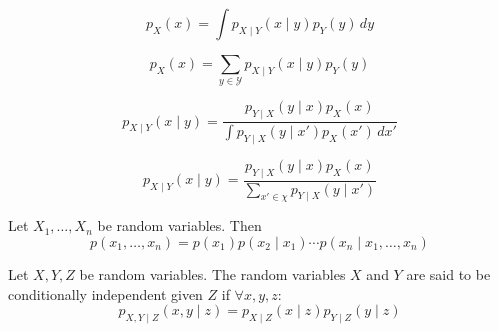 \begin{ctheorem*}
  \[p_X(x) = \int p_{X \mid Y}(x \mid y) p_Y(y) \, dy\]
\end{ctheorem*}

\begin{dtheorem*}
  \[p_X(x) = \sum_{y \in \mathcal{Y}} p_{X \mid Y}(x \mid y)p_Y(y)\]
\end{dtheorem*}

\begin{ctheorem*}
  \[p_{X \mid Y}(x \mid y) = \frac{p_{Y \mid X}(y \mid x) p_X(x)}{\int p_{Y \mid X}(y \mid x') p_X(x') \, dx'}\]
\end{ctheorem*}

\begin{dtheorem*}
  \[p_{X \mid Y}(x \mid y) = \frac{p_{Y \mid X}(y \mid x) p_X(x)}{\sum_{x' \in \chi} p_{Y \mid X}(y \mid x')}\]
\end{dtheorem*}

\begin{theorem*}
  Let \(X_1, \ldots, X_n\) be random variables. Then
  \[p(x_1, \ldots, x_n) = p(x_1) p(x_2 \mid x_1) \cdots p(x_n \mid x_1, \ldots, x_n)\]
\end{theorem*}

\begin{theorem*}
  Let \(X, Y, Z\) be random variables. The random variables \(X\) and \(Y\) are said to be conditionally independent given \(Z\) if \(\forall x, y, z\):
  \vspace{-10pt}
  \[p_{X, Y \mid Z}(x, y \mid z) = p_{X \mid Z}(x \mid z) p_{Y \mid Z}(y \mid z)\]
\end{theorem*}
